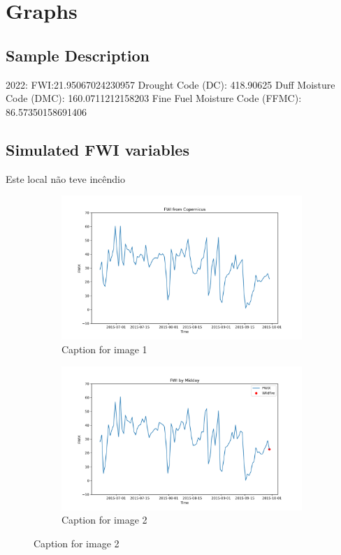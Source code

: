 \chapter{Graphs}
\label{sec:graphs}

\section{Sample Description}
2022:
FWI:21.95067024230957
Drought Code (DC):  418.90625
Duff Moisture Code (DMC):  160.0711212158203
Fine Fuel Moisture Code (FFMC):  86.57350158691406

\section{Simulated FWI variables}
Este local não teve incêndio
\begin{figure}[h]
\caption{HELLo}
    \centering
    \begin{subfigure}{0.49\textwidth}
        \centering
        \includegraphics[width=\textwidth]{graphs/2015MesmoSitio/2015CopernicusFWI12.png}
        \caption{Caption for image 1}
        \label{fig:img1}
    \end{subfigure}
    \hfill
    \begin{subfigure}{0.49\textwidth}
        \centering
        \includegraphics[width=\textwidth]{graphs/2015MesmoSitio/2015CalcFWI12.png}
        \caption{Caption for image 2}
        \label{fig:img2}
    \end{subfigure}
    \label{fig:both_images}
\end{figure}

